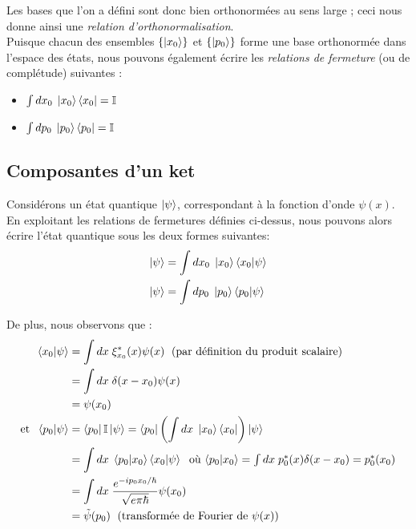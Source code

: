 \documentclass[../notesdecours]{subfiles}
\begin{document}
Les bases que l'on a défini sont donc bien orthonormées au sens large ; ceci nous donne ainsi une \textit{relation d'orthonormalisation}. \\

Puisque chacun des ensembles $\left\{ \ket{x_0} \right\}$ et $\left\{ \ket{p_0} \right\}$ forme une base orthonormée dans l'espace des états, nous pouvons également écrire les \textit{relations de fermeture} (ou de complétude) suivantes : 
\begin{itemize}[label=\textbullet]
    \item $\int dx_0 \; \ket{x_0}\bra{x_0} = \mathbb{I}$ 
    \item $\int dp_0 \; \ket{p_0}\bra{p_0} = \mathbb{I}$ 
\end{itemize}

\subsection{Composantes d'un ket}

Considérons un état quantique $\ket{\psi}$, correspondant à la fonction d'onde $\psi(x)$. En exploitant les relations de fermetures définies ci-dessus, nous pouvons alors écrire l'état quantique sous les deux formes suivantes:
\begin{align*}
\ket{\psi} &= \int dx_0 \; \ket{x_0} \braket{x_0|\psi} \\
\ket{\psi} &= \int dp_0 \; \ket{p_0} \braket{p_0|\psi}
\end{align*}

De plus, nous observons que : 
\begin{align}
    \braket{x_0| \psi} &= \int dx \; \xi_{x_0}^*(x) \psi(x) \; \mbox{ (par définition du produit scalaire)}  \notag\\
    &= \int dx \; \delta(x-x_0)\psi(x)  \notag\\
    &= \psi(x_0) \notag\\
    \mbox{et } \; \braket{p_0|\psi} &= \bra{p_0}\mathbb{I}\ket{\psi} = \bra{p_0} \left( \int dx \; \ket{x_0} \bra{x_0} \right) \ket{\psi} \notag\\
    &= \int dx \; \braket{p_0|x_0} \braket{x_0|\psi} \; \mbox{ où $\braket{p_0|x_0} = \int dx \; p_0^*(x) \delta(x-x_0) = p_0^*(x_0)$} \notag \\
    &= \int dx \; \frac{e^{-ip_0x_0/\hbar}}{\sqrt{e\pi \hbar}} \psi(x_0) \notag \\
	&= \tilde{\psi}(p_0) \; \mbox{ (transformée de Fourier de $\psi(x)$)} \label{eq:chap6-psi_p}
\end{align}
\end{document}

